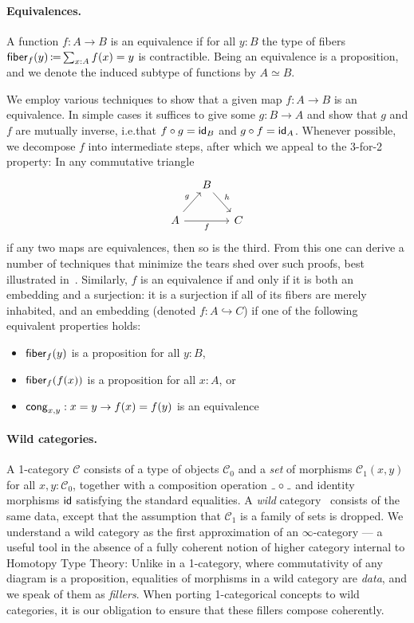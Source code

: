 \paragraph{Equivalences.}
A function \( f : A \to B \) is an equivalence if for all \( y : B \) the type of fibers \( \operatorname{\mathsf{fiber}}_f(y) \operatorname{\mathrel{\coloneq}} \sum_{x : A} f(x) = y \) is contractible.
Being an equivalence is a proposition, and we denote the induced subtype of functions by \( A \simeq B \).

We employ various techniques to show that a given map \( f : A \to B \) is an equivalence.
In simple cases it suffices to give some \( g : B \to A \) and show that \( g \) and \( f \) are mutually inverse,
i.e.\@ that \( f \circ g = \mathsf{id}_B \) and \( g \circ f = \mathsf{id}_A \).
Whenever possible, we decompose \( f \) into intermediate steps,
after which we appeal to the 3-for-2 property: In any commutative triangle
\[
  \begin{tikzcd}[column sep=small]
      & B & \\
    A &   & C
    \ar[from=2-1,to=1-2, "g"]
    \ar[from=1-2,to=2-3, "h"]
    \ar[from=2-1,to=2-3, "f"']
  \end{tikzcd}
\]
if any two maps are equivalences, then so is the third.
From this one can derive a number of techniques that minimize the tears shed over such proofs,
best illustrated in~\cite{Jong2025FormalizingEquivalencesTears}.
Similarly, \( f \) is an equivalence if and only if it is both an embedding and a surjection:
it is a surjection if all of its fibers are merely inhabited, and an embedding (denoted \( f : A \hookrightarrow C \)) if one of the following equivalent properties holds:
\begin{itemize}
  \item \( \operatorname{\mathsf{fiber}}_f(y) \) is a proposition for all \( y : B \),
  \item \( \operatorname{\mathsf{fiber}}_f(f(x)) \) is a proposition for all \( x : A \), or
  \item \( \mathsf{cong}_{x,y} : x = y \to f(x) = f(y) \) is an equivalence
\end{itemize}

\paragraph{Wild categories.}
A 1-category \( \mathcal{C} \) consists of a type of objects \( \mathcal{C}_0 \) and a \emph{set} of morphisms
\( \mathcal{C}_1(x, y) \) for all \( x, y : \mathcal{C}_0 \),
together with a composition operation \( \Blank \circ \Blank \) and identity morphisms \( \mathsf{id} \)
satisfying the standard equalities.
A \emph{wild} category~\cite{CapriottiKraus2017UnivalentHigherCategories} consists of the same data,
except that the assumption that \( \mathcal{C}_1 \) is a family of sets is dropped.
We understand a wild category as the first approximation of an \( \infty \)-category ---
a useful tool in the absence of a fully coherent notion of higher category internal to Homotopy Type Theory:
Unlike in a 1-category, where commutativity of any diagram is a proposition,
equalities of morphisms in a wild category are \emph{data},
and we speak of them as \emph{fillers}.
When porting 1-categorical concepts to wild categories,
it is our obligation to ensure that these fillers compose coherently.

